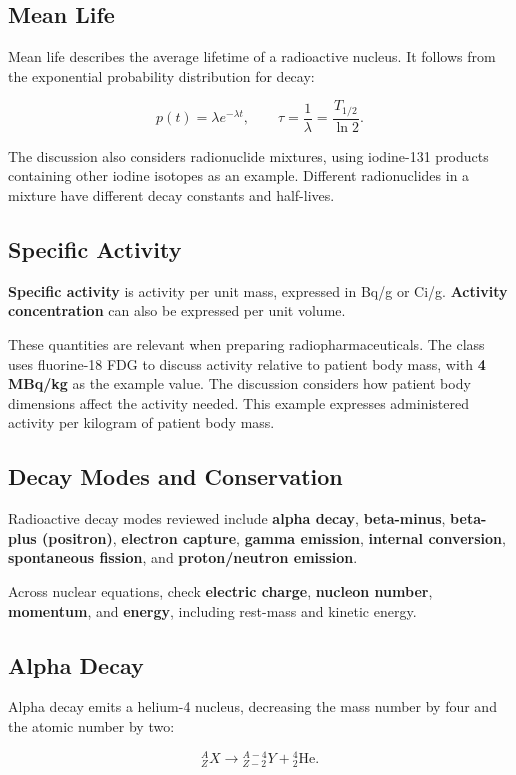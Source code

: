 \documentclass[11pt,a4paper]{article}
\let\originalsubsection\subsection
\renewcommand{\subsection}{\Needspace{8\baselineskip}\originalsubsection}
\begin{document}
\subsection{Mean Life}
Mean life describes the average lifetime of a radioactive nucleus. It follows from the exponential probability distribution for decay:

\[p(t)=\lambda e^{-\lambda t},\qquad \tau=\frac{1}{\lambda}=\frac{T_{1/2}}{\ln 2}.\]

The discussion also considers radionuclide mixtures, using iodine-131 products containing other iodine isotopes as an example. Different radionuclides in a mixture have different decay constants and half-lives.

\subsection{Specific Activity}
\textbf{Specific activity} is activity per unit mass, expressed in Bq/g or Ci/g. \textbf{Activity concentration} can also be expressed per unit volume.

These quantities are relevant when preparing radiopharmaceuticals. The class uses fluorine-18 FDG to discuss activity relative to patient body mass, with \textbf{4 MBq/kg} as the example value. The discussion considers how patient body dimensions affect the activity needed. This example expresses administered activity per kilogram of patient body mass.

\subsection{Decay Modes and Conservation}
Radioactive decay modes reviewed include \textbf{alpha decay}, \textbf{beta-minus}, \textbf{beta-plus (positron)}, \textbf{electron capture}, \textbf{gamma emission}, \textbf{internal conversion}, \textbf{spontaneous fission}, and \textbf{proton/neutron emission}.

Across nuclear equations, check \textbf{electric charge}, \textbf{nucleon number}, \textbf{momentum}, and \textbf{energy}, including rest-mass and kinetic energy.

\subsection{Alpha Decay}
Alpha decay emits a helium-4 nucleus, decreasing the mass number by four and the atomic number by two:

\[{}^{A}_{Z}X\longrightarrow{}^{A-4}_{Z-2}Y+{}^{4}_{2}\mathrm{He}.\]
\end{document}
